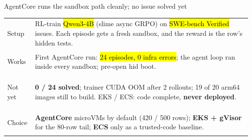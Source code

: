 \begin{frame}{AgentCore runs the sandbox path cleanly; no issue solved yet}
\footnotesize
\begin{tabularx}{\textwidth}{@{}>{\bfseries\raggedright\arraybackslash}p{2.0cm}X@{}}
\toprule
Setup & RL-train \hl{Qwen3-4B} (slime async GRPO) on \hl{SWE-bench Verified} issues. Each episode gets a fresh sandbox, and the reward is the row's hidden tests.\\
Works & First AgentCore run: \hl{24 episodes, 0 infra errors}; the agent loop ran inside every sandbox; pre-open hid boot.\\
Not yet & \textbf{0 / 24 solved}; trainer CUDA OOM after 2 rollouts; 19 of 20 arm64 images still to build. EKS / ECS: code complete, \textbf{never deployed}.\\
Choice & \textbf{AgentCore} microVMs by default (420 / 500 rows); \textbf{EKS + gVisor} for the 80-row tail; \textbf{ECS} only as a trusted-code baseline.\\
\bottomrule
\end{tabularx}
\end{frame}


